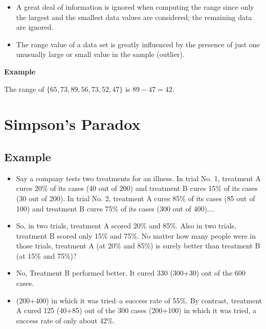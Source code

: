 \documentclass[]{report}
\begin{document}
{\begin{itemize}
\item A great deal of information is ignored when computing the range since only the largest and the smallest data values are considered; the remaining data are ignored.

\item The range value of a data set is greatly influenced by the presence of just one unusually large or small value in the sample (outlier).
\end{itemize}

\textbf{Example}


The range of $\{65,73,89,56,73,52,47\}$ is $ 89-47 = 42$.



\section{Simpson's Paradox}

\subsection{Example}
\begin{itemize}
	\item Say a company tests two treatments for an illness. In trial No. 1, treatment A cures 20\% of its cases (40 out of 200) and treatment B cures 15\% of its cases (30 out of 200). In trial No. 2, treatment A cures 85\% of its cases (85 out of 100) and treatment B cures 75\% of its cases (300 out of 400)....
	\item
	So, in two trials, treatment A scored 20\% and 85\%. Also in two trials, treatment B scored only 15\% and 75\%. No matter how many people were in those trials, treatment A (at 20\% and 85\%) is surely better than treatment B (at 15\% and 75\%)?
	\item
	No, Treatment B performed better. It cured 330 (300+30) out of the 600 cases.
	\item
	(200+400) in which it was tried--a success rate of 55\%. By contrast, treatment A cured 125 (40+85) out of the 300 cases (200+100) in which it was tried, a success rate of only about 42\%.
\end{itemize}


}
\end{document}
